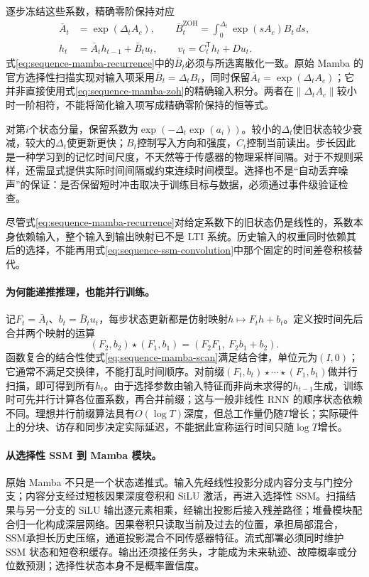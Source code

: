逐步冻结这些系数，精确零阶保持对应
\begin{align}
 \bar A_t&=\exp(\Delta_t A_c),\qquad
 \bar B_t^{\mathrm{ZOH}}=\int_0^{\Delta_t}\exp(sA_c)B_t\,ds,
 \label{eq:sequence-mamba-zoh}\\
 h_t&=\bar A_t h_{t-1}+\bar B_t u_t,\qquad
 v_t=C_t^{\mathsf T}h_t+Du_t.
 \label{eq:sequence-mamba-recurrence}
\end{align}
式\eqref{eq:sequence-mamba-recurrence}中的$\bar B_t$必须与所选离散化一致。原始 Mamba 的官方选择性扫描实现对输入项采用$\bar B_t=\Delta_t B_t$，同时保留$\bar A_t=\exp(\Delta_t A_c)$；它并非直接使用式\eqref{eq:sequence-mamba-zoh}的精确输入积分。两者在$\|\Delta_t A_c\|$较小时一阶相符，不能将简化输入项写成精确零阶保持的恒等式。

对第$i$个状态分量，保留系数为$\exp(-\Delta_t\exp(a_i))$。较小的$\Delta_t$使旧状态较少衰减，较大的$\Delta_t$使更新更快；$B_t$控制写入方向和强度，$C_t$控制当前读出。步长因此是一种学习到的记忆时间尺度，不天然等于传感器的物理采样间隔。对于不规则采样，还需显式提供实际时间间隔或约束连续时间模型。选择也不是“自动丢弃噪声”的保证：是否保留短时冲击取决于训练目标与数据，必须通过事件级验证检查。

尽管式\eqref{eq:sequence-mamba-recurrence}对给定系数下的旧状态仍是线性的，系数本身依赖输入，整个输入到输出映射已不是 LTI 系统。历史输入的权重同时依赖其后的选择，不能再用式\eqref{eq:sequence-ssm-convolution}中那个固定的时间差卷积核替代。

\paragraph{为何能递推推理，也能并行训练。}
记$F_t=\bar A_t$、$b_t=\bar B_t u_t$，每步状态更新都是仿射映射$h\mapsto F_t h+b_t$。定义按时间先后合并两个映射的运算
\begin{equation}
 (F_2,b_2)\star(F_1,b_1)
   =(F_2F_1,\ F_2b_1+b_2).
 \label{eq:sequence-mamba-scan}
\end{equation}
函数复合的结合性使式\eqref{eq:sequence-mamba-scan}满足结合律，单位元为$(I,0)$；它通常不满足交换律，不能打乱时间顺序。对前缀$(F_t,b_t)\star\cdots\star(F_1,b_1)$做并行扫描，即可得到所有$h_t$。由于选择参数由输入特征而非尚未求得的$h_{t-1}$生成，训练时可先并行计算各位置系数，再合并前缀；这与一般非线性 RNN 的顺序状态依赖不同。理想并行前缀算法具有$O(\log T)$深度，但总工作量仍随$T$增长；实际硬件上的分块、访存和同步决定实际延迟，不能据此宣称运行时间只随$\log T$增长。

\paragraph{从选择性 SSM 到 Mamba 模块。}
原始 Mamba 不只是一个状态递推式。输入先经线性投影分成内容分支与门控分支；内容分支经过短核因果深度卷积和 SiLU 激活，再进入选择性 SSM。扫描结果与另一分支的 SiLU 输出逐元素相乘，经输出投影后接入残差路径；堆叠模块配合归一化构成深层网络。因果卷积只读取当前及过去的位置，承担局部混合，SSM承担长历史压缩，通道投影混合不同传感器特征。流式部署必须同时维护 SSM 状态和短卷积缓存。输出还须接任务头，才能成为未来轨迹、故障概率或分位数预测；选择性状态本身不是概率置信度。

